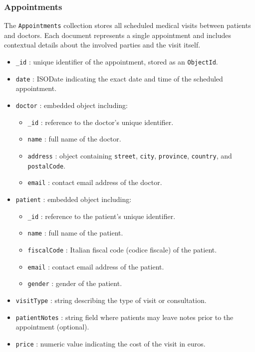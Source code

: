 \subsubsection{Appointments}
The \texttt{Appointments} collection stores all scheduled medical visits between patients and doctors. Each document represents a single appointment and includes contextual details about the involved parties and the visit itself.

\begin{itemize}
  \item \texttt{\_id} : unique identifier of the appointment, stored as an \texttt{ObjectId}.
  \item \texttt{date} : ISODate indicating the exact date and time of the scheduled appointment.
  \item \texttt{doctor} : embedded object including:
  \begin{itemize}
    \item \texttt{\_id} : reference to the doctor’s unique identifier.
    \item \texttt{name} : full name of the doctor.
    \item \texttt{address} : object containing \texttt{street}, \texttt{city}, \texttt{province}, \texttt{country}, and \texttt{postalCode}.
    \item \texttt{email} : contact email address of the doctor.
  \end{itemize}
  \item \texttt{patient} : embedded object including:
  \begin{itemize}
    \item \texttt{\_id} : reference to the patient’s unique identifier.
    \item \texttt{name} : full name of the patient.
    \item \texttt{fiscalCode} : Italian fiscal code (codice fiscale) of the patient.
    \item \texttt{email} : contact email address of the patient.
    \item \texttt{gender} : gender of the patient.
  \end{itemize}
  \item \texttt{visitType} : string describing the type of visit or consultation.
  \item \texttt{patientNotes} : string field where patients may leave notes prior to the appointment (optional).
  \item \texttt{price} : numeric value indicating the cost of the visit in euros.
\end{itemize}

